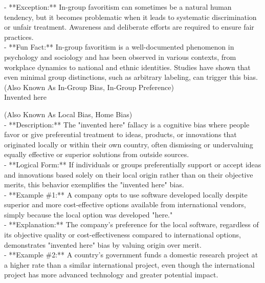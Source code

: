 \documentclass[a4paper,12pt,single,pdftex]{scrbook}
\begin{document}
    
      - **Exception:** In-group favoritism can sometimes be a natural human tendency, but it becomes problematic when it leads to systematic discrimination or unfair treatment. Awareness and deliberate efforts are required to ensure fair practices.
    \\

    
      - **Fun Fact:** In-group favoritism is a well-documented phenomenon in psychology and sociology and has been observed in various contexts, from workplace dynamics to national and ethnic identities. Studies have shown that even minimal group distinctions, such as arbitrary labeling, can trigger this bias.
    \\

  
    
      (Also Known As In-Group Bias, In-Group Preference)
    \\

  

Invented here
    
      (Also Known As Local Bias, Home Bias)
    \\

  
    
      - **Description:** The "invented here" fallacy is a cognitive bias where people favor or give preferential treatment to ideas, products, or innovations that originated locally or within their own country, often dismissing or undervaluing equally effective or superior solutions from outside sources.
    \\

    
      - **Logical Form:** If individuals or groups preferentially support or accept ideas and innovations based solely on their local origin rather than on their objective merits, this behavior exemplifies the "invented here" bias.
    \\

    
      - **Example \#1:** A company opts to use software developed locally despite superior and more cost-effective options available from international vendors, simply because the local option was developed "here."
    \\

    
      - **Explanation:** The company’s preference for the local software, regardless of its objective quality or cost-effectiveness compared to international options, demonstrates "invented here" bias by valuing origin over merit.
    \\

    
      - **Example \#2:** A country’s government funds a domestic research project at a higher rate than a similar international project, even though the international project has more advanced technology and greater potential impact.
    \\
\end{document}
